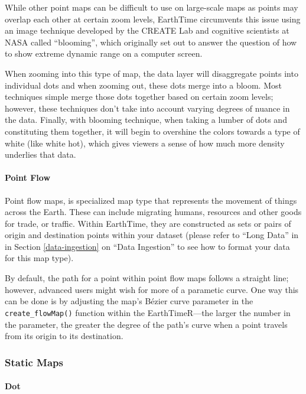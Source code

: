 \documentclass[
  12pt,
]{krantz}
\begin{document}
While other point maps can be difficult to use on large-scale maps as points may overlap each other at certain zoom levels, EarthTime circumvents this issue using an image technique developed by the CREATE Lab and cognitive scientists at NASA called ``blooming'', which originally set out to answer the question of how to show extreme dynamic range on a computer screen.

When zooming into this type of map, the data layer will disaggregate points into individual dots and when zooming out, these dots merge into a bloom. Most techniques simple merge those dots together based on certain zoom levels; however, these techniques don't take into account varying degrees of nuance in the data. Finally, with blooming technique, when taking a lumber of dots and constituting them together, it will begin to overshine the colors towards a type of white (like white hot), which gives viewers a sense of how much more density underlies that data.

\hypertarget{point-flow}{%
\paragraph*{Point Flow}\label{point-flow}}

Point flow maps, is specialized map type that represents the movement of things across the Earth. These can include migrating humans, resources and other goods for trade, or traffic. Within EarthTime, they are constructed as sets or pairs of origin and destination points within your dataset (please refer to ``Long Data'' in in Section \ref{data-ingestion} on ``Data Ingestion'' to see how to format your data for this map type).

By default, the path for a point within point flow maps follows a straight line; however, advanced users might wish for more of a parametic curve. One way this can be done is by adjusting the map's Bézier curve parameter in the \texttt{create\_flowMap()} function within the EarthTimeR---the larger the number in the parameter, the greater the degree of the path's curve when a point travels from its origin to its destination.

\hypertarget{static-maps}{%
\subsubsection*{Static Maps}\label{static-maps}}


\hypertarget{dot}{%
\paragraph*{Dot}\label{dot}}
\end{document}
